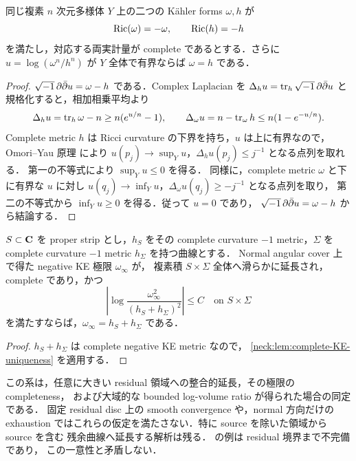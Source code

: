 \begin{lemma}
\label{neck:lem:complete-KE-uniqueness}
同じ複素 $n$ 次元多様体 $Y$ 上の二つの K\"ahler forms $\omega,h$ が
\[
 \operatorname{Ric}(\omega)=-\omega,\qquad \operatorname{Ric}(h)=-h
\]
を満たし，対応する両実計量が complete であるとする．さらに
$u=\log(\omega^n/h^n)$ が $Y$ 全体で有界ならば $\omega=h$ である．
\end{lemma}

\begin{proof}
$\sqrt{-1}\,\partial\bar\partial u=\omega-h$ である．Complex Laplacian を
$\Delta_h u=\operatorname{tr}_h\sqrt{-1}\,\partial\bar\partial u$ と規格化すると，相加相乗平均より
\begin{equation}\label{neck:eq:complete-uniqueness-laplacians}
 \Delta_hu=\operatorname{tr}_h\omega-n\ge n(e^{u/n}-1),\qquad
 \Delta_\omega u=n-\operatorname{tr}_\omega h\le n(1-e^{-u/n}).
\end{equation}
Complete metric $h$ は Ricci curvature の下界を持ち，$u$ は上に有界なので，
Omori--Yau 原理\cite[Theorem~1]{YauSchwarzThm2} により
$u(p_j)\to\sup_Yu$，$\Delta_hu(p_j)\le j^{-1}$ となる点列を取れる．
第一の不等式により $\sup_Yu\le0$ を得る．
同様に，complete metric $\omega$ と下に有界な $u$ に対し
$u(q_j)\to\inf_Yu$，$\Delta_\omega u(q_j)\ge-j^{-1}$ となる点列を取り，
第二の不等式から $\inf_Yu\ge0$ を得る．従って $u=0$ であり，
$\sqrt{-1}\,\partial\bar\partial u=\omega-h$ から結論する．
\end{proof}

\begin{corollary}
\label{neck:cor:complete-product-identification}
$S\subset\mathbf C$ を proper strip とし，$h_S$ をその complete curvature $-1$
metric，$\Sigma$ を complete curvature $-1$ metric $h_\Sigma$ を持つ曲線とする．
Normal angular cover 上で得た negative KE 極限 $\omega_\infty$ が，
複素積 $S\times\Sigma$ 全体へ滑らかに延長され，complete であり，かつ
\[
 \left|\log\frac{\omega_\infty^2}{(h_S+h_\Sigma)^2}\right|\le C
 \quad\text{on }S\times\Sigma
\]
を満たすならば，$\omega_\infty=h_S+h_\Sigma$ である．
\end{corollary}

\begin{proof}
$h_S+h_\Sigma$ は complete negative KE metric なので，
\cref{neck:lem:complete-KE-uniqueness} を適用する．
\end{proof}

この系は，任意に大きい residual 領域への整合的延長，その極限の completeness，
および大域的な bounded log-volume ratio が得られた場合の同定である．
固定 residual disc 上の smooth convergence や，normal 方向だけの exhaustion
ではこれらの仮定を満たさない．特に source を除いた領域から source を含む
残余曲線へ延長する解析は残る．
 の例は residual 境界まで不完備であり，
この一意性と矛盾しない．


